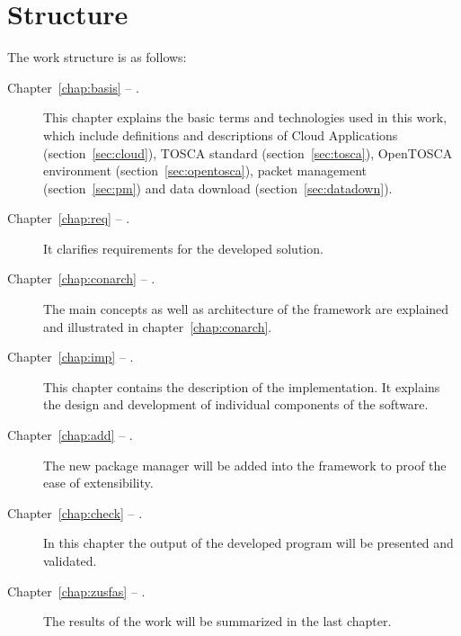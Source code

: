 \section*{Structure}
The work structure is as follows:
\begin{description}
\item[Chapter~\ref{chap:basis} -- .] This chapter explains the basic terms and technologies used in this work, which include definitions and descriptions of Cloud Applications (section~\ref{sec:cloud}), TOSCA standard (section~\ref{sec:tosca}), OpenTOSCA environment  (section~\ref{sec:opentosca}), packet management (section~\ref{sec:pm}) and data download (section~\ref{sec:datadown}).
\item[Chapter~\ref{chap:req} -- .] It clarifies requirements for the developed solution.
\item[Chapter~\ref{chap:conarch} -- .] The main concepts as well as architecture of the framework are explained and illustrated in chapter~\ref{chap:conarch}.
\item[Chapter~\ref{chap:imp} -- .] This chapter contains the description of the implementation.
 It explains the design and development of individual components of the software. 
\item[Chapter~\ref{chap:add} -- .] The new package manager will be added into the framework to proof the ease of extensibility. 
\item[Chapter~\ref{chap:check} -- .] In this chapter the output of the developed program will be presented and validated.
\item[Chapter~\ref{chap:zusfas} -- .] The results of the work will be summarized in the last chapter.
\end{description}
